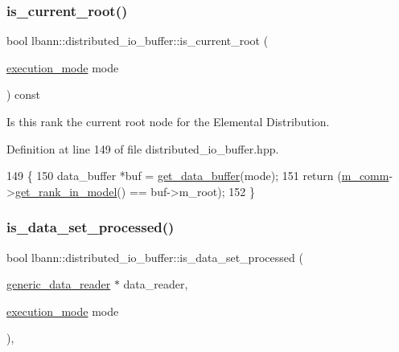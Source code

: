 \subsubsection{\texorpdfstring{is\+\_\+current\+\_\+root()}{is\_current\_root()}}
{\footnotesize\ttfamily bool lbann\+::distributed\+\_\+io\+\_\+buffer\+::is\+\_\+current\+\_\+root (\begin{DoxyParamCaption}\item[{\hyperlink{base_8hpp_a2781a159088df64ed7d47cc91c4dc0a8}{execution\+\_\+mode}}]{mode }\end{DoxyParamCaption}) const\hspace{0.3cm}{\ttfamily [inline]}}



Is this rank the current root node for the Elemental Distribution. 



Definition at line 149 of file distributed\+\_\+io\+\_\+buffer.\+hpp.


\begin{DoxyCode}
149                                                   \{
150     data\_buffer *buf = \hyperlink{classlbann_1_1distributed__io__buffer_ac176f3fced1191534a985f831136aa3e}{get\_data\_buffer}(mode);
151     \textcolor{keywordflow}{return} (\hyperlink{classlbann_1_1generic__io__buffer_a2e4a46c85c8b30e10b1cc5acaa2c4cca}{m\_comm}->\hyperlink{classlbann_1_1lbann__comm_a789453454468a3b70de768537c50ca52}{get\_rank\_in\_model}() == buf->m\_root);
152   \}
\end{DoxyCode}
\mbox{\label{classlbann_1_1distributed__io__buffer_a2e214f6542d9b12c8a29bf41d0ee220e}} 
\subsubsection{\texorpdfstring{is\+\_\+data\+\_\+set\+\_\+processed()}{is\_data\_set\_processed()}}
{\footnotesize\ttfamily bool lbann\+::distributed\+\_\+io\+\_\+buffer\+::is\+\_\+data\+\_\+set\+\_\+processed (\begin{DoxyParamCaption}\item[{\hyperlink{classlbann_1_1generic__data__reader}{generic\+\_\+data\+\_\+reader} $\ast$}]{data\+\_\+reader,  }\item[{\hyperlink{base_8hpp_a2781a159088df64ed7d47cc91c4dc0a8}{execution\+\_\+mode}}]{mode }\end{DoxyParamCaption})\hspace{0.3cm}{\ttfamily [override]}, {\ttfamily [virtual]}}

